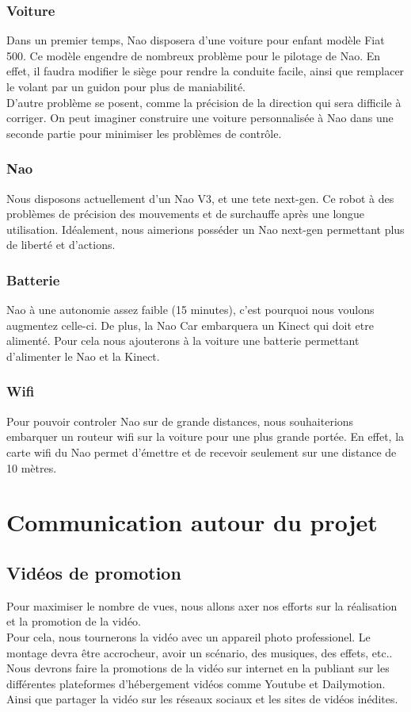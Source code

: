 \documentclass[11pt]{report} %
\begin{document}
			\subsubsection{Voiture}
			Dans un premier temps, Nao disposera d'une voiture pour enfant modèle Fiat 500. Ce modèle engendre de nombreux problème pour le pilotage de Nao. En effet, il faudra modifier le siège pour rendre la conduite facile, ainsi que remplacer le volant par un guidon pour plus de maniabilité.\\
			D'autre problème se posent, comme la précision de la direction qui sera difficile à corriger. On peut imaginer construire une voiture personnalisée à Nao dans une seconde partie pour minimiser les problèmes de contrôle.
			\subsubsection{Nao}
			Nous disposons actuellement d'un Nao V3, et une tete next-gen. Ce robot à des problèmes de précision des mouvements et de surchauffe après une longue utilisation. Idéalement, nous aimerions posséder un Nao next-gen permettant plus de liberté et d'actions.
			\subsubsection{Batterie}
			Nao à une autonomie assez faible (15 minutes), c'est pourquoi nous voulons augmentez celle-ci. De plus, la Nao Car embarquera un Kinect qui doit etre alimenté. Pour cela nous ajouterons à la voiture une batterie permettant d'alimenter le Nao et la Kinect.
			\subsubsection{Wifi}
			Pour pouvoir controler Nao sur de grande distances, nous souhaiterions embarquer un routeur wifi sur la voiture pour une plus grande portée. En effet, la carte wifi du Nao permet d'émettre et de recevoir seulement sur une distance de 10 mètres.
	\newpage
	\section{Communication autour du projet}
		\subsection{Vidéos de promotion}
			Pour maximiser le nombre de vues, nous allons axer nos efforts sur la réalisation et la promotion de la vidéo.\\
			Pour cela, nous tournerons la vidéo avec un appareil photo professionel. Le montage devra être accrocheur, avoir un scénario, des musiques, des effets, etc..\\
			Nous devrons faire la promotions de la vidéo sur internet en la publiant sur les différentes plateformes d'hébergement vidéos comme Youtube et Dailymotion. Ainsi que partager la vidéo sur les réseaux sociaux et les sites de vidéos inédites.
\end{document}
